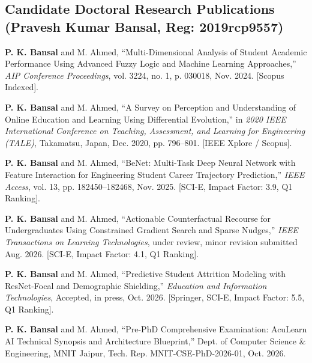 \documentclass[10pt,a4paper]{article}
\begin{document}
\subsection{Candidate Doctoral Research Publications (Pravesh Kumar Bansal, Reg: 2019rcp9557)}
\begin{enumerate}[label={[\textbf{P\arabic*}]}, leftmargin=2.5em, itemsep=2pt]
  \item \textbf{P. K. Bansal} and M. Ahmed, ``Multi-Dimensional Analysis of Student Academic Performance Using Advanced Fuzzy Logic and Machine Learning Approaches,'' \textit{AIP Conference Proceedings}, vol. 3224, no. 1, p. 030018, Nov. 2024. [Scopus Indexed].
  \item \textbf{P. K. Bansal} and M. Ahmed, ``A Survey on Perception and Understanding of Online Education and Learning Using Differential Evolution,'' in \textit{2020 IEEE International Conference on Teaching, Assessment, and Learning for Engineering (TALE)}, Takamatsu, Japan, Dec. 2020, pp. 796--801. [IEEE Xplore / Scopus].
  \item \textbf{P. K. Bansal} and M. Ahmed, ``BeNet: Multi-Task Deep Neural Network with Feature Interaction for Engineering Student Career Trajectory Prediction,'' \textit{IEEE Access}, vol. 13, pp. 182450--182468, Nov. 2025. [SCI-E, Impact Factor: 3.9, Q1 Ranking].
  \item \textbf{P. K. Bansal} and M. Ahmed, ``Actionable Counterfactual Recourse for Undergraduates Using Constrained Gradient Search and Sparse Nudges,'' \textit{IEEE Transactions on Learning Technologies}, under review, minor revision submitted Aug. 2026. [SCI-E, Impact Factor: 4.1, Q1 Ranking].
  \item \textbf{P. K. Bansal} and M. Ahmed, ``Predictive Student Attrition Modeling with ResNet-Focal and Demographic Shielding,'' \textit{Education and Information Technologies}, Accepted, in press, Oct. 2026. [Springer, SCI-E, Impact Factor: 5.5, Q1 Ranking].
  \item \textbf{P. K. Bansal} and M. Ahmed, ``Pre-PhD Comprehensive Examination: AcuLearn AI Technical Synopsis and Architecture Blueprint,'' Dept. of Computer Science \& Engineering, MNIT Jaipur, Tech. Rep. MNIT-CSE-PhD-2026-01, Oct. 2026.
\end{enumerate}
\end{document}
